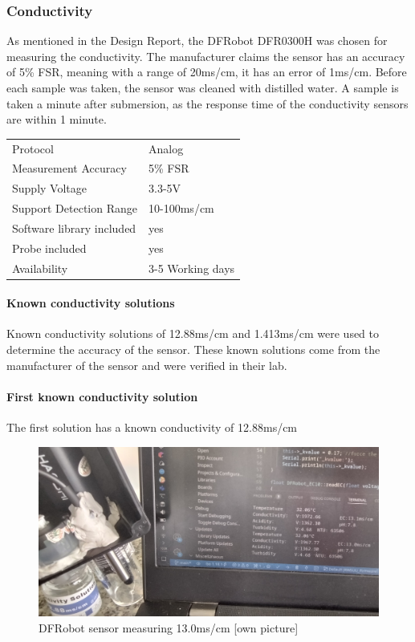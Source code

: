 \newpage
\subsubsection{Conductivity}
As mentioned in the Design Report, the DFRobot DFR0300H \cite{DFR0300H} was chosen for measuring the conductivity. The manufacturer claims the sensor has an accuracy of 5\% \gls{FSR}, meaning with a range of 20\gls{ms}/\gls{cm}, it has an error of 1\gls{ms}/\gls{cm}. Before each sample was taken, the sensor was cleaned with distilled water. A sample is taken a minute after submersion, as the response time of the conductivity sensors are within 1 minute.

\begin{table}[h!]
	\centering
	\quad
	\begin{tabular}{| l | l |}
    \hline
    Protocol & Analog\\
    Measurement Accuracy &  5\% FSR\\
    Supply Voltage & 3.3-5V\\
    Support Detection Range & 10-100\gls{ms}/\gls{cm}\\
    Software library included & yes \\
    Probe included & yes \\
    Availability & 3-5 Working days \\
    \hline
	\end{tabular}
\end{table}

\paragraph{Known conductivity solutions}
Known conductivity solutions of 12.88\gls{ms}/\gls{cm} and 1.413\gls{ms}/\gls{cm} were used to determine the accuracy of the sensor. These known solutions come from the manufacturer of the sensor and were verified in their lab.

\newpage
\paragraph{First known conductivity solution}
The first solution has a known conductivity of 12.88\gls{ms}/\gls{cm}

\begin{figure}[h]
\centering
\includegraphics[scale=0.6]{080_testing/sensors/21_ec1288_dfrobot.jpg}
\caption{DFRobot sensor measuring 13.0\gls{ms}/\gls{cm} [own picture]}
\end{figure}

